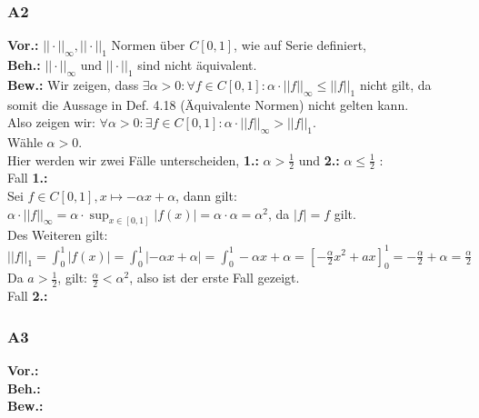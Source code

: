 \documentclass[12pt, a4paper]{article}
\newcommand*{\gap}{\text{ }}
\newcommand*{\vor}{\textbf{Vor.:} \gap}
\newcommand*{\beh}{\textbf{Beh.:} \gap}
\newcommand*{\bew}{\textbf{Bew.:} \gap}
\begin{document}
\subsubsection*{A2}
\vor \(||\cdot||_\infty, ||\cdot||_1\) Normen über \(C[0,1]\), wie auf Serie definiert,\\
\beh \(||\cdot||_\infty \text{ und } ||\cdot||_1\) sind nicht äquivalent. \\
\bew Wir zeigen, dass \(\exists \alpha > 0: \forall f \in C[0,1]: \alpha \cdot ||f||_\infty \le ||f||_1\) nicht gilt, da somit die Aussage in Def. 4.18 (Äquivalente Normen) nicht gelten kann. \\
Also zeigen wir: \(\forall \alpha > 0: \exists f \in C[0,1]: \alpha \cdot ||f||_\infty > ||f||_1\). \\
Wähle \(\alpha > 0\).\\
Hier werden wir zwei Fälle unterscheiden, \textbf{1.:} \(\alpha > \frac{1}{2}\) und \textbf{2.:} \(\alpha \le \frac{1}{2}\) : \\
Fall \textbf{1.:} \\
Sei \(f \in C[0,1], x \mapsto -\alpha x + \alpha\), dann gilt: \\
\(\alpha \cdot ||f||_\infty = \alpha \cdot \sup_{x\in [0,1]}|f(x)| = \alpha \cdot \alpha = \alpha^2\),  da \(|f| = f\) gilt. \\
Des Weiteren gilt: \(||f||_1 = \int_{0}^{1}|f(x)| = \int_{0}^{1}|-\alpha x + \alpha| = \int_{0}^{1}-\alpha x + \alpha = \left[-\frac{\alpha}{2}x^2+ ax\right]_0^1 = -\frac{\alpha}{2} + \alpha = \frac{\alpha}{2}\) \\
Da \(a > \frac{1}{2}\), gilt: \(\frac{\alpha}{2} < \alpha^2\), also ist der erste Fall gezeigt. \\
Fall \textbf{2.:} \\

\subsubsection*{A3}
\vor \\
\beh \\
\bew \\
\end{document}
